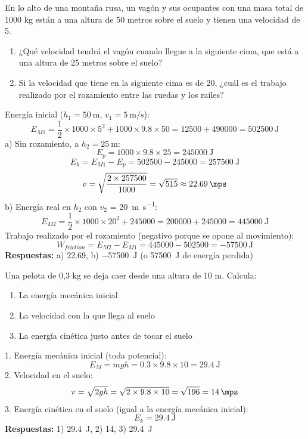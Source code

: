 \begin{exercise}
    En lo alto de una montaña rusa, un vagón y sus ocupantes con una masa total de 1000 kg están a una altura de 50 metros sobre el suelo y tienen una velocidad de \qty{5}{\mps}.
    \begin{enumerate}[label=\alph*)]
\item ¿Qué velocidad tendrá el vagón cuando llegue a la siguiente cima, que está a una altura de 25 metros sobre el suelo?
\item Si la velocidad que tiene en la siguiente cima es de \qty{20}{\mps}, ¿cuál es el trabajo realizado por el rozamiento entre las ruedas y los raíles?
    \end{enumerate}
    \begin{solu}
        Energía inicial (\( h_1 = \qty{50}{\metre} \), \( v_1 = \qty{5}{\metre\per\second} \)):
        \[
            E_{M1} = \frac{1}{2} \times 1000 \times 5^2 + 1000 \times 9.8 \times 50 = 12500 + 490000 = \qty{502500}{\joule}
        \]
        a) Sin rozamiento, a \( h_2 = \qty{25}{\metre} \):
        \[
            E_p = 1000 \times 9.8 \times 25 = \qty{245000}{\joule}
        \]
        \[
            E_k = E_{M1} - E_p = 502500 - 245000 = \qty{257500}{\joule}
        \]
        \[
            v = \sqrt{\frac{2 \times 257500}{1000}} = \sqrt{515} \approx \qty{22.69}{\mps}
        \]
        b) Energía real en \( h_2 \) con \( v_2 \) = \qty{20}{\metre\per\second}:
        \[
            E_{M2} = \frac{1}{2} \times 1000 \times 20^2 + 245000 = 200000 + 245000 = \qty{445000}{\joule}
        \]
        Trabajo realizado por el rozamiento (negativo porque se opone al movimiento):
        \[
            W_{friction} = E_{M2} - E_{M1} = 445000 - 502500 = \qty{-57500}{\joule}
        \]
        \textbf{Respuestas:} a) \qty{22.69}{\mps}, b) \qty{-57500}{\joule} (o \qty{57500}{\joule} de energía perdida)
    \end{solu}
\end{exercise}

\begin{exercise}
    Una pelota de 0,3 kg se deja caer desde una altura de 10 m. Calcula:
    \begin{enumerate}
        \item La energía mecánica inicial
        \item La velocidad con la que llega al suelo
        \item La energía cinética justo antes de tocar el suelo
    \end{enumerate}
    \begin{solu}
        1. Energía mecánica inicial (toda potencial):
        \[
            E_M = mgh = 0.3 \times 9.8 \times 10 = \qty{29.4}{\joule}
        \]
        2. Velocidad en el suelo:
        \[
            v = \sqrt{2gh} = \sqrt{2 \times 9.8 \times 10} = \sqrt{196} = \qty{14}{\mps}
        \]
        3. Energía cinética en el suelo (igual a la energía mecánica inicial):
        \[
            E_k = \qty{29.4}{\joule}
        \]
        \textbf{Respuestas:} 1) \qty{29.4}{\joule}, 2) \qty{14}{\mps}, 3) \qty{29.4}{\joule}
    \end{solu}
\end{exercise}

